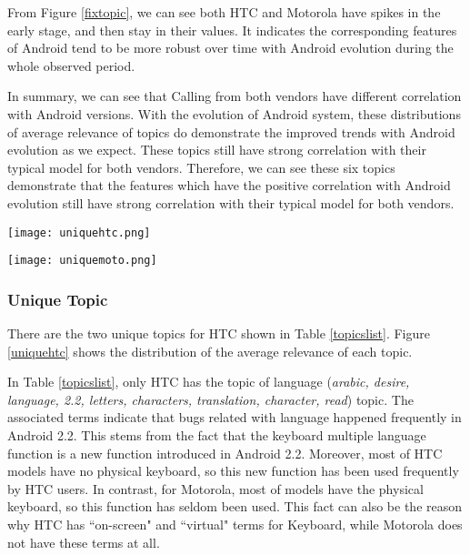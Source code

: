 \documentclass[10pt, conference, compsocconf]{IEEEtran}
\begin{document}
From Figure \ref{fixtopic}, we can see both HTC and Motorola have spikes in the early stage, and then stay in their values. It indicates the corresponding features of Android tend to be more robust over time with Android evolution during the whole observed period.

In summary, we can see that Calling from both vendors have different correlation with Android versions. With the evolution of Android system, these distributions of average relevance of topics do demonstrate the improved trends with Android evolution as we expect. These topics still have strong correlation with their typical model for both vendors. Therefore, we can see these six topics demonstrate that the features which have the positive correlation with Android evolution still have strong correlation with their typical model for both vendors.




\begin{figure*}[htb]
\centering
\texttt{[image: uniquehtc.png]}
\caption{Unique Topics relevance in HTC}
\label{uniquehtc}
\end{figure*}

\begin{figure*}[htb]
\centering
\texttt{[image: uniquemoto.png]}
\caption{Unique Topics relevance in Motorola}
\label{uniquemoto}
\end{figure*}


\subsubsection{Unique Topic}

There are the two unique topics for HTC shown in Table \ref{topicslist}. Figure \ref{uniquehtc} shows the distribution of the average relevance of each topic.

In Table \ref{topicslist}, only HTC has the topic of language (\textit{arabic, desire, language, 2.2, letters, characters, translation, character, read}) topic. The associated terms indicate that bugs related with language happened frequently in Android 2.2. This stems from the fact that the keyboard multiple language function is a new function introduced in Android 2.2. Moreover, most of HTC models have no physical keyboard, so this new function has been used frequently by HTC users. In contrast, for Motorola, most of models have the physical keyboard, so this function has seldom been used. This fact can also be the reason why HTC has ``on-screen" and ``virtual" terms for Keyboard, while Motorola does not have these terms at all.
\end{document}
